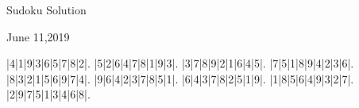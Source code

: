 \documentclass{article}
\begin{document}
\begin{center}
\Huge{Sudoku Solution}
\end{center}
\begin{center}
\Large{June 11,2019}
\end{center}
\begin{sudoku}
|4|1|9|3|6|5|7|8|2|.
|5|2|6|4|7|8|1|9|3|.
|3|7|8|9|2|1|6|4|5|.
|7|5|1|8|9|4|2|3|6|.
|8|3|2|1|5|6|9|7|4|.
|9|6|4|2|3|7|8|5|1|.
|6|4|3|7|8|2|5|1|9|.
|1|8|5|6|4|9|3|2|7|.
|2|9|7|5|1|3|4|6|8|.
\end{sudoku}
\end{document}
